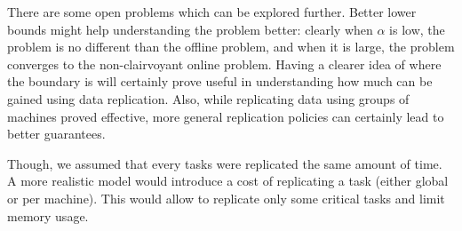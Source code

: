 \documentclass[10pt, conference, compsocconf]{IEEEtran}
\begin{document}
There are some open problems which can be explored further. Better
lower bounds might help understanding the problem better: clearly when
$\alpha$ is low, the problem is no different than the offline problem,
and when it is large, the problem converges to the non-clairvoyant
online problem. Having a clearer idea of where the boundary is will
certainly prove useful in understanding how much can be gained using
data replication. Also, while replicating data using groups of
machines proved effective, more general replication policies can
certainly lead to better guarantees.

Though, we assumed that every tasks were replicated the same amount of
time. A more realistic model would introduce a cost of replicating a
task (either global or per machine). This would allow to replicate
only some critical tasks and limit memory usage.


 
\end{document}
